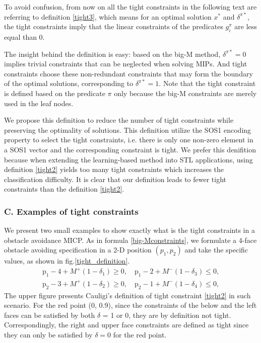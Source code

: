 \documentclass[a4paper]{report}
\begin{document}
To avoid confusion, from now on all the tight constraints in the following text are referring to definition \ref*{tight3}, which means for an optimal solution $x^*$ and $\delta^{\pi*}$, the tight constraints imply that the linear constraints of the predicates $g_i^{\pi}$ are less equal than 0.

The insight behind the definition is easy: based on the big-M method, $\delta^{\pi*}=0$ implies trivial constraints that can be neglected when solving MIPs. And tight constraints choose these non-redundant constraints that may form the boundary of the optimal solutions, corresponding to $\delta^{\pi*}=1$. Note that the tight constraint is defined based on the predicate $\pi$ only because the big-M constraints are merely used in the leaf nodes.

We propose this definition to reduce the number of tight constraints while preserving the optimality of solutions. This definition utilize the SOS1 encoding property to select the tight constraints, i.e. there is only one non-zero element in a SOS1 vector and the corresponding constraint is tight. We prefer this denifition because when extending the learning-based method into STL applications, using definition \ref*{tight2} yields too many tight constraints which increases the classification difficulty. It is clear that our definition leads to fewer tight constraints than the definition \ref*{tight2}.

\subsubsection*{C. Examples of tight constraints}
We present two small examples to show exactly what is the tight constraints in a obstacle avoidance MICP. As in formula \ref*{big-Mconstraints}, we formulate a 4-face obstacle avoiding specification in a 2-D position $(p_1,p_2)$ and take the specific values, as shown in fig.\ref*{tight_definition}.
\begin{equation}
    \begin{split}
        \mathrm{p}_1-4 + M^+\left(1-\delta_1\right)\geq 0,
        \quad \mathrm{p}_1-2 + M^-\left(1-\delta_3\right) \leq 0, \\
        \mathrm{p}_2-3 + M^+\left(1-\delta_2\right) \geq 0, \quad \mathrm{p}_2-1 + M^-\left(1-\delta_4\right) \leq 0,
    \end{split}
    \end{equation}
The upper figure presents Cauligi's definition of tight constraint \ref{tight2} in such scenario. For the red point (0, 0.9), since the constraints of the below and the left faces can be satisfied by both $\delta$ = 1 or 0, they are by definition not tight. Correspondingly, the right and upper face constraints are defined as tight since they can only be satisfied by $\delta = 0$ for the red point. 
\end{document}
